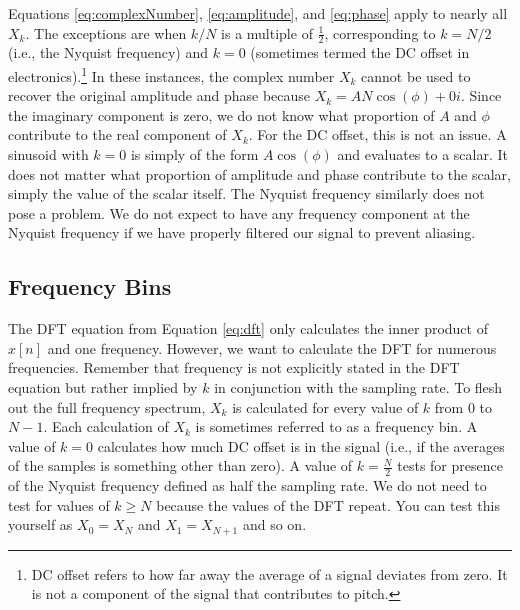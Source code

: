Equations \ref{eq:complexNumber}, \ref{eq:amplitude}, and \ref{eq:phase} apply to nearly all $X_k$. 
The exceptions are when $k/N$
is a multiple of $\frac{1}{2}$, corresponding to $k = N/2$ (i.e., the Nyquist frequency) and $k = 0$ 
(sometimes termed the DC offset in electronics).\footnote{DC offset refers to how far away the average of a signal
deviates from zero.  It is not a component of the signal that contributes to pitch.}  In these 
instances, the complex number $X_k$ cannot be used to recover the original amplitude and phase because
$X_k = AN\cos{(\phi)} + 0i$.  Since the imaginary component is zero, we do not know
what proportion of $A$ and $\phi$ contribute to the real component of $X_k$.  For the DC offset, this is not an issue.
A sinusoid with $k = 0$ is simply of the form $A\cos(\phi)$ and evaluates to a scalar.  It does not matter
what proportion of amplitude and phase contribute to the scalar, simply the value of the scalar itself.  The
Nyquist frequency  similarly does not pose a problem.  We do not expect to have
any frequency component at the Nyquist frequency if we have properly filtered our signal to prevent aliasing.

\subsection*{Frequency Bins}

The DFT equation from Equation \ref{eq:dft} only calculates the inner product of $x[n]$ and one
frequency.  However, we want to calculate the DFT for numerous frequencies.  Remember that
frequency is not explicitly stated in the DFT equation but rather implied by $k$ in conjunction with the 
sampling rate.  To flesh out the full frequency spectrum, $X_k$ is calculated for every value of $k$ from 0  to $N - 1$. 
Each calculation of $X_k$ is sometimes referred to as a frequency bin. 
A value of $k = 0$
calculates how much DC offset is in the signal (i.e., if the averages of the samples is something other than zero).
A value of $k = \frac{N}{2}$ tests for presence of the Nyquist frequency defined as half the sampling rate.  We do
not need to test for values of $k \geq N$ because the values of the DFT repeat.
You can test this yourself as $X_0 = X_N$ and $X_1 = X_{N + 1}$ and so on.

